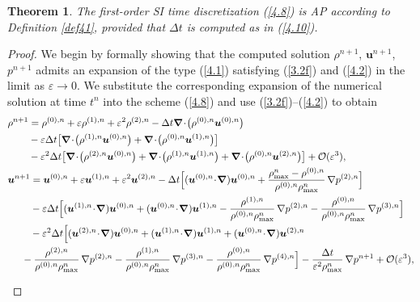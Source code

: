 \documentclass[preprint,12pt]{elsarticle}
\newtheorem{theorem}{Theorem}[section]
\def\bnabla{\bm{\nabla}}
\newcommand{\dt}{\Delta t}
\newcommand{\ve}{\varepsilon}
\newcommand\eref[1]{(\ref{#1})}
\begin{document}
\begin{theorem}\label{thm31}
	The first-order SI time discretization \eref{4.8} is AP according to Definition \ref{def41}, provided that $\dt$ is computed as in
	\eref{4.10}.
\end{theorem}
\begin{proof}
	We begin by formally showing that the computed solution $\rho^{n+1}$, $\bm u^{n+1}$, $p^{n+1}$ admits an expansion of the type \eref{4.1}
	satisfying \eref{3.2f} and \eref{4.2} in the limit as $\ve\to0$. We substitute the corresponding expansion of the numerical solution at 
	time $t^n$ into the scheme \eref{4.8} and use \eref{3.2f}--\eref{4.2} to obtain
	\begin{align}
		&\begin{aligned}
			\rho^{n+1}&=\rho^{(0),n}+\ve\rho^{(1),n}+\ve^2\rho^{(2),n}-\dt\bnabla\!\cdot\!\big(\rho^{(0),n}\bm u^{(0),n}\big)\\
			&-\ve \dt \big[\bnabla\!\cdot\!\big(\rho^{(1),n}\bm u^{(0),n}\big)+\bnabla\!\cdot\!\big(\rho^{(0),n}\bm u^{(1),n}\big)\big]\\
			&-\ve^2 \dt \big[\bnabla\!\cdot\!\big(\rho^{(2),n}\bm u^{(0),n}\big)+\bnabla\!\cdot\!\big(\rho^{(1),n}\bm u^{(1),n}\big)+\bnabla\!\cdot\!\big(\rho^{(0),n}\bm u^{(2),n}\big)\big]+{\cal O}(\ve^3),
			\label{4.11}
		\end{aligned}\\
		&\begin{aligned}
			\bm u^{n+1}&=\bm u^{(0),n}+\ve\bm u^{(1),n}+\ve^2\bm u^{(2),n}-\dt\Big[(\bm u^{(0),n}\!\cdot\!\bnabla)\bm u^{(0),n}+
			\frac{\rho_{\max}^n-\rho^{(0),n}}{\rho^{(0),n}\rho_{\max}^n}\,\nabla p^{(2),n}\Big]\\
			&-\ve\dt\Big[(\bm u^{(1),n}\!\cdot\!\bnabla)\bm u^{(0),n}+(\bm u^{(0),n}\!\cdot\!\bnabla)\bm u^{(1),n}-
			\frac{\rho^{(1),n}}{\rho^{(0),n}\rho_{\max}^n}\,\nabla p^{(2),n}-\frac{\rho^{(0),n}}{\rho^{(0),n}\rho_{\max}^n}\,\nabla p^{(3),n}\Big]\\
			&-\ve^2\dt\Big[(\bm u^{(2),n}\!\cdot\!\bnabla)\bm u^{(0),n}+(\bm u^{(1),n}\!\cdot\!\bnabla)\bm u^{(1),n}+
			(\bm u^{(0),n}\!\cdot\!\bnabla)\bm u^{(2),n}\\
			&\hspace*{-0.3cm}
			-\frac{\rho^{(2),n}}{\rho^{(0),n}\rho_{\max}^n}\,\nabla p^{(2),n}-\frac{\rho^{(1),n}}{\rho^{(0),n}\rho_{\max}^n}\,\nabla p^{(3),n}
			-\frac{\rho^{(0),n}}{\rho^{(0),n}\rho_{\max}^n}\,\nabla p^{(4),n}\Big]
			-\frac{\dt}{\ve^2 \rho_{\max}^n}\,\nabla p^{n+1}+{\cal O}(\ve^3),\label{4.12}
		\end{aligned}\\[0.8ex]

\end{align}
\end{proof}
\end{document}
